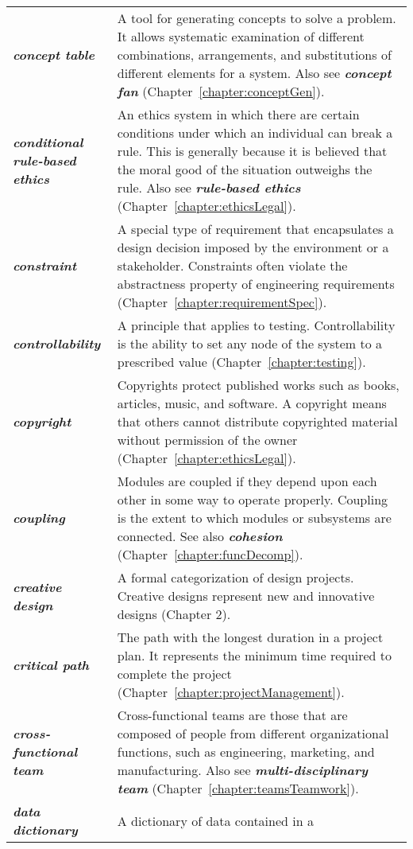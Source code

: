 \begin{longtable} { p{4cm} p{11cm}}
\emph{\textbf{concept table}} & A tool for generating concepts to solve
a problem. It allows systematic examination of different combinations,
arrangements, and substitutions of different elements for a system. Also
see \emph{\textbf{concept fan}} (Chapter~\ref{chapter:conceptGen}). \\
\emph{\textbf{conditional rule-based ethics}} & An ethics system in
which there are certain conditions under which an individual can break a
rule. This is generally because it is believed that the moral good of
the situation outweighs the rule. Also see \emph{\textbf{rule-based
ethics}} (Chapter~\ref{chapter:ethicsLegal}). \\
\emph{\textbf{constraint}} & A special type of requirement that
encapsulates a design decision imposed by the environment or a
stakeholder. Constraints often violate the abstractness property of
engineering requirements (Chapter~\ref{chapter:requirementSpec}). \\
\emph{\textbf{controllability}} & A principle that applies to testing.
Controllability is the ability to set any node of the system to a
prescribed value (Chapter~\ref{chapter:testing}). \\
\emph{\textbf{copyright}} & Copyrights protect published works such as
books, articles, music, and software. A copyright means that others
cannot distribute copyrighted material without permission of the owner
(Chapter~\ref{chapter:ethicsLegal}). \\
\emph{\textbf{coupling}} & Modules are coupled if they depend upon each
other in some way to operate properly. Coupling is the extent to which
modules or subsystems are connected. See also \emph{\textbf{cohesion}}
(Chapter~\ref{chapter:funcDecomp}). \\
\emph{\textbf{creative design}} & A formal categorization of design
projects. Creative designs represent new and innovative designs (Chapter
2). \\
\emph{\textbf{critical path}} & The path with the longest duration in a
project plan. It represents the minimum time required to complete the
project (Chapter~\ref{chapter:projectManagement}). \\
\emph{\textbf{cross-functional team}} & Cross-functional teams are those
that are composed of people from different organizational functions,
such as engineering, marketing, and manufacturing. Also see
\emph{\textbf{multi-disciplinary team}} (Chapter~\ref{chapter:teamsTeamwork}). \\
\emph{\textbf{data dictionary}} & A dictionary of data contained in a

\end{longtable}
